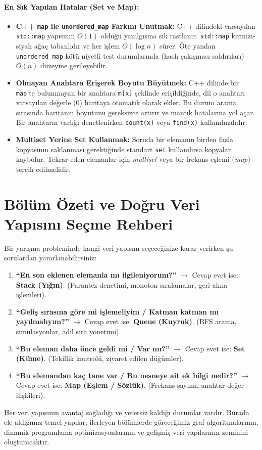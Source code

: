 \paragraph{En Sık Yapılan Hatalar (Set ve Map):}
\begin{itemize}
    \item \textbf{C++ \texttt{map} ile \texttt{unordered\_map} Farkını Unutmak:} C++ dilindeki varsayılan \texttt{std::map} yapısının $O(1)$ olduğu yanılgısına sık rastlanır. \texttt{std::map} kırmızı-siyah ağaç tabanlıdır ve her işlem $O(\log n)$ sürer. Öte yandan \texttt{unordered\_map} kötü niyetli test durumlarında (hash çakışması saldırıları) $O(n)$ düzeyine gerileyebilir.
    \item \textbf{Olmayan Anahtara Erişerek Boyutu Büyütmek:} C++ dilinde bir \texttt{map}'te bulunmayan bir anahtara \texttt{m[x]} şeklinde erişildiğinde, dil o anahtarı varsayılan değerle ($0$) haritaya otomatik olarak ekler. Bu durum arama sırasında haritanın boyutunu gereksizce artırır ve mantık hatalarına yol açar. Bir anahtarın varlığı denetlenirken \texttt{count(x)} veya \texttt{find(x)} kullanılmalıdır.
    \item \textbf{Multiset Yerine Set Kullanmak:} Soruda bir elemanın birden fazla kopyasının saklanması gerektiğinde standart \texttt{set} kullanılırsa kopyalar kaybolur. Tekrar eden elemanlar için \emph{multiset} veya bir frekans eşlemi (\emph{map}) tercih edilmelidir.
\end{itemize}

\section*{Bölüm Özeti ve Doğru Veri Yapısını Seçme Rehberi}

Bir yarışma probleminde hangi veri yapısını seçeceğinize karar verirken şu sorulardan yararlanabilirsiniz:
\begin{enumerate}
    \item \textbf{``En son eklenen elemanla mı ilgileniyorum?''} 
    $\to$ Cevap evet ise: \textbf{Stack (Yığın)}. (Parantez denetimi, monoton sıralamalar, geri alma işlemleri).
    \item \textbf{``Geliş sırasına göre mi işlemeliyim / Katman katman mı yayılmalıyım?''} 
    $\to$ Cevap evet ise: \textbf{Queue (Kuyruk)}. (BFS arama, simülasyonlar, adil sıra yönetimi).
    \item \textbf{``Bu eleman daha önce geldi mi / Var mı?''} 
    $\to$ Cevap evet ise: \textbf{Set (Küme)}. (Tekillik kontrolü, ziyaret edilen düğümler).
    \item \textbf{``Bu elemandan kaç tane var / Bu nesneye ait ek bilgi nedir?''} 
    $\to$ Cevap evet ise: \textbf{Map (Eşlem / Sözlük)}. (Frekans sayımı, anahtar-değer ilişkileri).
\end{enumerate}

Her veri yapısının avantaj sağladığı ve yetersiz kaldığı durumlar vardır. Burada ele aldığımız temel yapılar; ilerleyen bölümlerde göreceğimiz graf algoritmalarının, dinamik programlama optimizasyonlarının ve gelişmiş veri yapılarının zeminini oluşturacaktır.
